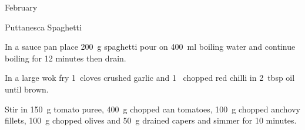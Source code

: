 \begin{menu}{February}
\begin{recipe}{1}{Puttanesca Spaghetti}
\begin{ingredients}
		\end{ingredients}
	
	
	
    \begin{instructions}
    \item 
    In a
    sauce pan
    place
    200~g  spaghetti
    pour on
    400~ml  boiling water and continue boiling for 12 minutes then drain.
  \item 
        In a large wok fry
        1~cloves crushed garlic
        and
        1~ chopped red chilli
        in
        2~tbsp  oil
        until brown.
      \item 
        Stir in
        150~g  tomato puree,
        400~g chopped can tomatoes,
        100~g chopped anchovy fillets,
        100~g chopped olives
        and
        50~g drained capers
        and simmer for 10 minutes.
      
    \end{instructions}
    \end{recipe}%
  
    \clearpage
    \end{menu}
	
